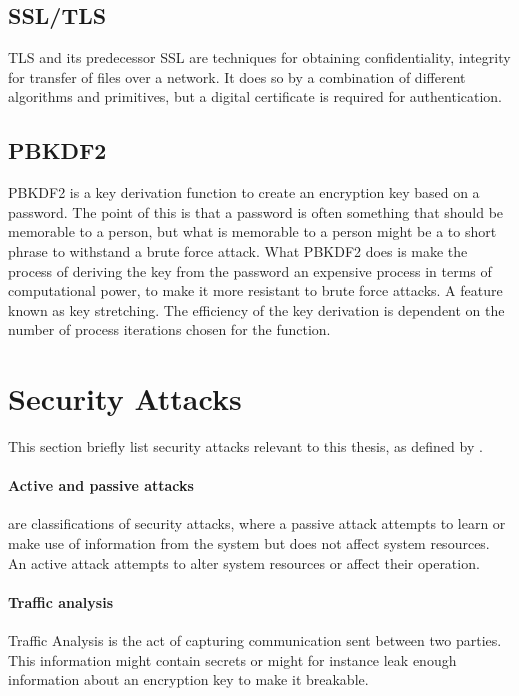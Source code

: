 \documentclass[pdftex,english,10pt,b5paper,twoside]{book}
\begin{document}
\subsection{SSL/TLS}
\ac{TLS} and its predecessor \ac{SSL} are techniques for obtaining
confidentiality, integrity for transfer of files over a
network\cite{stallings}. It does so by a combination of different algorithms
and primitives, but a digital certificate is required for authentication.

\subsection{PBKDF2}
\label{sec:PBKDF2}
\ac{PBKDF2} is a key derivation function to create an encryption key based on
a password. The point of this is that a password is often something that should
be memorable to a person, but what is memorable to a person might be a to short
phrase to withstand a brute force attack. What \ac{PBKDF2} does is make the
process of deriving the key from the password an expensive process in terms of
computational power, to make it more resistant to brute force attacks. A feature
known as key stretching. The efficiency of the key derivation is dependent on the
number of process iterations chosen for the function.

\section{Security Attacks}
This section briefly list security attacks relevant to this thesis, as defined
by \citeauthor{stallings}.

\paragraph{Active and passive attacks} are classifications of security attacks,
where a passive attack attempts to learn or make use of information from the
system but does not affect system resources. An active attack attempts to alter
system resources or affect their operation.

\paragraph{Traffic analysis} Traffic Analysis is the act of capturing
communication sent between two parties. This information might contain secrets
or might for instance leak enough information about an encryption key to make
it breakable.
\end{document}
